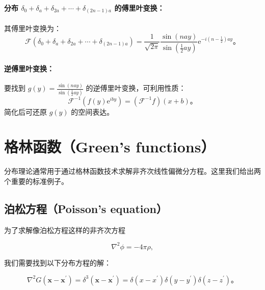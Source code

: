 \paragraph{\texorpdfstring{分布
$\delta_{0} + \delta_{a} + \delta_{2a} + \cdots + \delta_{(2n-1)a}$
的傅里叶变换：}{分布 \textbackslash delta\_\{0\} + \textbackslash delta\_\{a\} + \textbackslash delta\_\{2a\} + \textbackslash cdots + \textbackslash delta\_\{(2n-1)a\} 的傅里叶变换：}}\label{ux5206ux5e03-delta_0-delta_a-delta_2a-cdots-delta_2n-1a-ux7684ux5085ux91ccux53f6ux53d8ux6362}

其傅里叶变换为：
 $$
\mathcal{F}\left(\delta_{0} + \delta_{a} + \delta_{2a} + \cdots + \delta_{(2n-1)a}\right) = \frac{1}{\sqrt{2 \pi}} \frac{\sin(n a y)}{\sin(\frac{1}{2} a y)} \mathrm{e}^{-i(n-\frac{1}{2}) a y}。
$$
\paragraph{逆傅里叶变换：}\label{ux9006ux5085ux91ccux53f6ux53d8ux6362}

要找到 $g(y) = \frac{\sin(n a y)}{\sin(\frac{1}{2} a y)}$
的逆傅里叶变换，可利用性质：
 $$
\mathcal{F}^{-1}\left(f(y) \mathrm{e}^{i b y}\right) = \left(\mathcal{F}^{-1}f\right)(x+b)。
$$
简化后可还原 $g(y)$ 的空间表达。

\section{格林函数（Green's
functions）}\label{sec:12.4}

分布理论通常用于通过格林函数技术求解非齐次线性偏微分方程。这里我们给出两个重要的标准例子。

\subsection{泊松方程（Poisson's
equation）}

为了求解像泊松方程这样的非齐次方程

\begin{equation}\label{eq:12.15} 
 \nabla^{2} \phi=-4 \pi \rho, 
 \end{equation}

我们需要找到以下分布方程的解：

\begin{equation}\label{eq:12.16} 
 \nabla^{2} G\left(\mathbf{x}-\mathbf{x}^{\prime}\right)=\delta^{3}\left(\mathbf{x}-\mathbf{x}^{\prime}\right)=\delta\left(x-x^{\prime}\right) \delta\left(y-y^{\prime}\right) \delta\left(z-z^{\prime}\right)。 
 \end{equation}

